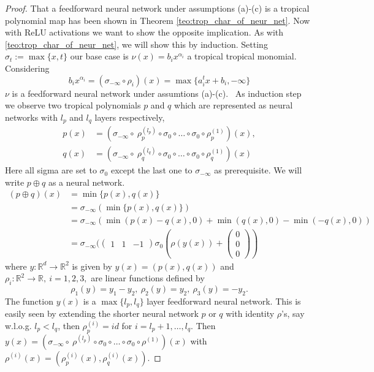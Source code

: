 \documentclass{article}
\theoremstyle{definition}
\begin{document}
\begin{proof}
That a feedforward neural network under assumptions (a)-(c) is a tropical polynomial map has been shown in Theorem \ref{teo:trop_char_of_neur_net}. Now with ReLU activations we want to show the opposite implication. As with \ref{teo:trop_char_of_neur_net}, we will show this by induction. Setting $\sigma_{t} := \max \{ x, t\}$ our base case is $\nu (x) = b_{i} x^{\alpha_{i}}$ a tropical tropical monomial. Considering
$$b_{i}x^{\alpha_{i}} = (\sigma_{- \infty} \circ \rho_{i})(x) = \max \{ a_{i}^{t}x + b_{i}, -\infty \}$$
$\nu$ is a feedforward neural network under assumtions (a)-(c). \
As induction step we observe two tropical polynomials $p$ and $q$ which are represented as neural networks with $l_{p}$ and $l_{q}$ layers respectively,
\begin{align*}
p(x) &= (\sigma_{- \infty} \circ \ \rho_{p}^{(l_{p})} \circ \sigma_{0} \circ \dots \circ \sigma_{0} \circ \rho_{p}^{(1)})(x), \\
q(x) &= (\sigma_{- \infty} \circ \ \rho_{q}^{(l_{q})} \circ \sigma_{0} \circ \dots \circ \sigma_{0} \circ \rho_{q}^{(1)})(x)
\end{align*}
Here all sigma are set to $\sigma_{0}$ except the last one to $\sigma_{- \infty}$ as prerequisite. We will write $p \oplus q$ as a neural network.
\begin{align*}
(p \oplus q)(x) 
&= \min \{ p(x), q(x) \} \\
&= \sigma_{- \infty }( \min \{ p(x), q(x) \} ) \\
&= \sigma_{- \infty }( \min(p(x)-q(x), 0) + \min(q(x), 0) - \min(-q(x), 0)) \\
&= \sigma_{- \infty }(\begin{pmatrix} 1 & 1 & -1 \end{pmatrix} \sigma_{0}(\rho(y(x)) + \begin{pmatrix} 0 \\ 0 \\ 0 \end{pmatrix})
\end{align*}
where $y:\mathbb{R}^{d} \to \mathbb{R}^{2}$ is given by $y(x)=(p(x),q(x))$ and $\rho_{i}:\mathbb{R}^{2} \to \mathbb{R}, \ i=1,2, 3,$ are linear functions defined by
$$\rho_{1}(y)=y_{1}-y_{2}, \ \rho_{2}(y)=y_{2}, \ \rho_{3}(y)= -y_{2}.$$
The function $y(x)$ is a $\max \{ l_{p}, l_{q} \}$ layer feedforward neural network. This is easily seen by extending the shorter neural network $p$ or $q$ with identity $\rho$'s, say w.l.o.g. $l_{p} < l_{q}$, then $\rho^{(i)}_{p} = id$ for $i = l_{p} + 1, \dots , l_{q}$. Then $y(x)=(\sigma_{- \infty} \circ \ \rho^{(l_{p})} \circ \sigma_{0} \circ \dots \circ \sigma_{0} \circ \rho^{(1)})(x)$ with $\rho^{(i)}(x) = (\rho_{p}^{(i)}(x), \rho_{q}^{(i)}(x))$.

\end{proof}
\end{document}
